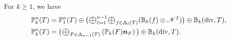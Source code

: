 \documentclass[mathpazo]{cicp}
\newcommand{\Oplus}{\ensuremath{\vcenter{\hbox{\scalebox{1.5}{$\oplus$}}}}}
\begin{document}
\begin{theorem}\label{thm:BDMgeodecomp}
For $k\geq 1$, we have
\begin{align}
\label{eq:divpolynomialdecomp}
\mathbb P_k^n(T) &= \mathbb P_1^n(T) \oplus \big(\Oplus_{\ell=1}^{n-1}\Oplus_{f\in\Delta_{\ell}(T)}(\mathbb B_{k}( f) \otimes \mathscr{N}^f)\big)\oplus \mathbb B_k(\div, T),\\
\label{eq:divpolynomialdecomp2}
\mathbb P_k^n(T) &= \big(\Oplus_{F\in\Delta_{n-1}(T)} \left ( \mathbb P_k(F)\bs n_F \right )\big)\oplus \mathbb B_k(\div, T).
\end{align}
\end{theorem}
\end{document}

